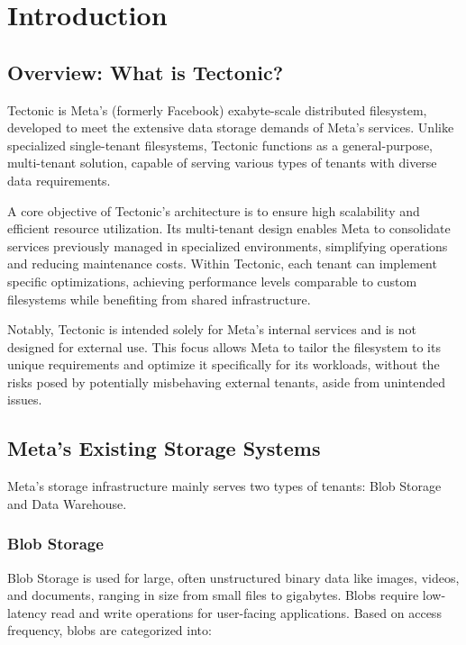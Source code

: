 \section{Introduction}

\subsection{Overview: What is Tectonic?}\label{sec:intro}

Tectonic\cite{tectonic} is Meta's (formerly Facebook) exabyte-scale distributed filesystem, developed to meet the extensive data storage demands of Meta's services. Unlike specialized single-tenant filesystems, Tectonic functions as a general-purpose, multi-tenant solution, capable of serving various types of tenants with diverse data requirements.

A core objective of Tectonic's architecture is to ensure high scalability and efficient resource utilization. Its multi-tenant design enables Meta to consolidate services previously managed in specialized environments, simplifying operations and reducing maintenance costs. Within Tectonic, each tenant can implement specific optimizations, achieving performance levels comparable to custom filesystems while benefiting from shared infrastructure.

Notably, Tectonic is intended solely for Meta's internal services and is not designed for external use. This focus allows Meta to tailor the filesystem to its unique requirements and optimize it specifically for its workloads, without the risks posed by potentially misbehaving external tenants, aside from unintended issues.

\subsection{Meta's Existing Storage Systems}\label{sec:existing}

Meta's storage infrastructure mainly serves two types of tenants: Blob Storage and Data Warehouse.

\subsubsection{Blob Storage}\label{sec:blob_storage}

Blob Storage is used for large, often unstructured binary data like images, videos, and documents, ranging in size from small files to gigabytes. Blobs require low-latency read and write operations for user-facing applications. Based on access frequency, blobs are categorized into:

